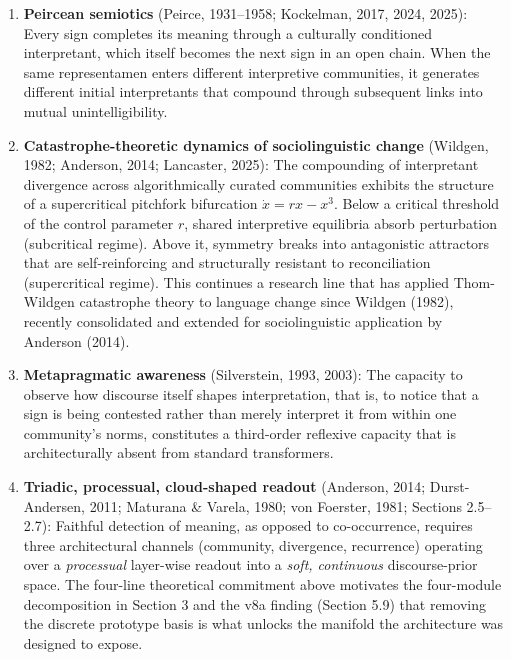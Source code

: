 \documentclass[
  11pt]{article}
\begin{document}
\begin{enumerate}
\def\labelenumi{\arabic{enumi}.}
\item
  \textbf{Peircean semiotics} (Peirce, 1931--1958; Kockelman, 2017,
  2024, 2025): Every sign completes its meaning through a culturally
  conditioned interpretant, which itself becomes the next sign in an
  open chain. When the same representamen enters different interpretive
  communities, it generates different initial interpretants that
  compound through subsequent links into mutual unintelligibility.
\item
  \textbf{Catastrophe-theoretic dynamics of sociolinguistic change}
  (Wildgen, 1982; Anderson, 2014; Lancaster, 2025): The compounding of
  interpretant divergence across algorithmically curated communities
  exhibits the structure of a supercritical pitchfork bifurcation
  \(\dot{x} = rx - x^3\). Below a critical threshold of the control
  parameter \(r\), shared interpretive equilibria absorb perturbation
  (subcritical regime). Above it, symmetry breaks into antagonistic
  attractors that are self-reinforcing and structurally resistant to
  reconciliation (supercritical regime). This continues a research line
  that has applied Thom-Wildgen catastrophe theory to language change
  since Wildgen (1982), recently consolidated and extended for
  sociolinguistic application by Anderson (2014).
\item
  \textbf{Metapragmatic awareness} (Silverstein, 1993, 2003): The
  capacity to observe how discourse itself shapes interpretation, that
  is, to notice that a sign is being contested rather than merely
  interpret it from within one community's norms, constitutes a
  third-order reflexive capacity that is architecturally absent from
  standard transformers.
\item
  \textbf{Triadic, processual, cloud-shaped readout} (Anderson, 2014;
  Durst-Andersen, 2011; Maturana \& Varela, 1980; von Foerster, 1981;
  Sections 2.5--2.7): Faithful detection of meaning, as opposed to
  co-occurrence, requires three architectural channels (community,
  divergence, recurrence) operating over a \emph{processual} layer-wise
  readout into a \emph{soft, continuous} discourse-prior space. The
  four-line theoretical commitment above motivates the four-module
  decomposition in Section 3 and the v8a finding (Section 5.9) that
  removing the discrete prototype basis is what unlocks the manifold the
  architecture was designed to expose.
\end{enumerate}
\end{document}
